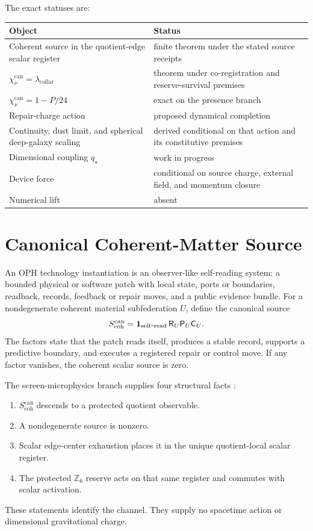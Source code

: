 \documentclass[11pt]{article}
\numberwithin{equation}{section}
\theoremstyle{remark}
\newcommand{\chican}{\chi_\nu^{\mathrm{can}}}
\newcommand{\scohcan}{S_{\mathrm{coh}}^{\mathrm{can}}}
\newcommand{\lambdac}{\lambda_{\mathrm{collar}}}
\begin{document}
The exact statuses are:
\begin{center}
\begin{tabularx}{0.94\textwidth}{@{}lX@{}}
\toprule
Object & Status \\
\midrule
Coherent source in the quotient-edge scalar register & finite theorem under the stated source receipts \\
\(\chican=\lambdac\) & theorem under co-registration and reserve-survival premises \\
\(\chican=1-P/24\) & exact on the presence branch \\
Repair-charge action & proposed dynamical completion \\
Continuity, dust limit, and spherical deep-galaxy scaling & derived conditional on that action and its constitutive premises \\
Dimensional coupling \(q_\star\) & work in progress \\
Device force & conditional on source charge, external field, and momentum closure \\
Numerical lift & absent \\
\bottomrule
\end{tabularx}
\end{center}

\tableofcontents

\section{Canonical Coherent-Matter Source}

An OPH technology instantiation is an observer-like self-reading system: a
bounded physical or software patch with local state, ports or boundaries,
readback, records, feedback or repair moves, and a public evidence bundle. For
a nondegenerate coherent material subfederation \(U\), define the canonical
source
\begin{equation}
\scohcan
=\mathbf 1_{\rm self\mbox{-}read}\,\mathsf R_U\mathsf P_U\mathsf C_U.
\label{eq:source}
\end{equation}
The factors state that the patch reads itself, produces a stable record,
supports a predictive boundary, and executes a registered repair or control
move. If any factor vanishes, the coherent scalar source is zero.

The screen-microphysics branch supplies four structural facts
\cite{oph-micro}:
\begin{enumerate}[label=S\arabic*.,leftmargin=*]
\item \(\scohcan\) descends to a protected quotient observable.
\item A nondegenerate source is nonzero.
\item Scalar edge-center exhaustion places it in the unique quotient-local
scalar register.
\item The protected \(\mathbb Z_6\) reserve acts on that same register and
commutes with scalar activation.
\end{enumerate}
These statements identify the channel. They supply no spacetime action or
dimensional gravitational charge.
\end{document}
